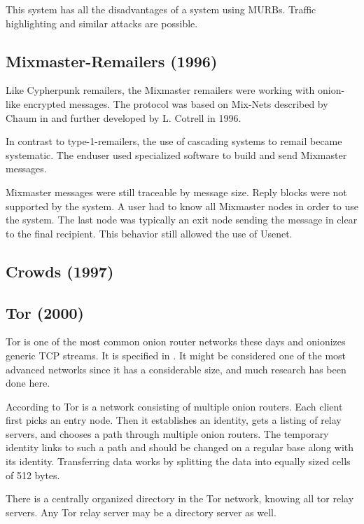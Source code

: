 This system has all the disadvantages of a system using MURBs. Traffic highlighting and similar attacks are possible.

\subsection{Mixmaster-Remailers (1996)\label{sec:remMixmaster}}
Like Cypherpunk remailers, the Mixmaster remailers were working with onion-like encrypted messages. The protocol was based on Mix-Nets described by Chaum in \cite{CHAUM1} and further developed by L. Cotrell in 1996. 

In contrast to type-1-remailers, the use of cascading systems to remail became systematic. The enduser used specialized software to build and send Mixmaster messages.

Mixmaster messages were still traceable by message size. Reply blocks were not supported by the system. A user had to know all Mixmaster nodes in order to use the system. The last node was typically an exit node sending the message in clear to the final recipient. This behavior still allowed the use of Usenet.

\subsection{Crowds (1997)}



\subsection{Tor (2000)\label{sec:tor}}
Tor is one of the most common onion router networks these days and onionizes generic TCP streams. It is specified in \cite{tor-spec}. It might be considered one of the most advanced networks since it has a considerable size, and much research has been done here.

According to \cite{onion-routing:pet2000} Tor is a network consisting of multiple onion routers. Each client first picks an entry node. Then it establishes an identity, gets a listing of relay servers, and chooses a path through multiple onion routers. The temporary identity links to such a path and should be changed on a regular base along with its identity. Transferring data works by splitting the data into equally sized cells of 512 bytes.

There is a centrally organized directory in the Tor network, knowing all tor relay servers. Any Tor relay server may be a directory server as well. 


